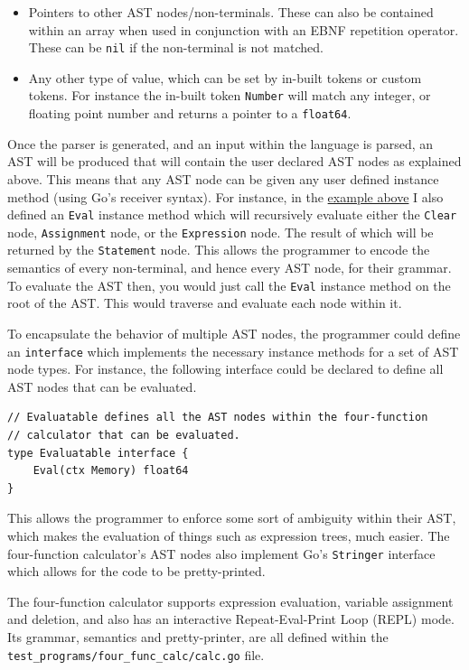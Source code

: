 \documentclass[]{full}
\theoremstyle{definition}
\begin{document}
\begin{itemize}
    \item Pointers to other AST nodes/non-terminals. These can also be contained within an array when used in conjunction with an EBNF repetition operator. These can be \verb|nil| if the non-terminal is not matched.
    \item Any other type of value, which can be set by in-built tokens or custom tokens. For instance the in-built token \verb|Number| will match any integer, or floating point number and returns a pointer to a \verb|float64|.
\end{itemize}

Once the parser is generated, and an input within the language is parsed, an AST will be produced that will contain the user declared AST nodes as explained above. This means that any AST node can be given any user defined instance method (using Go's receiver syntax). For instance, in the \hyperref[fig:four-func-calc-statement-ast-node]{example above} I also defined an \verb|Eval| instance method which will recursively evaluate either the \verb|Clear| node, \verb|Assignment| node, or the \verb|Expression| node. The result of which will be returned by the \verb|Statement| node. This allows the programmer to encode the semantics of every non-terminal, and hence every AST node, for their grammar. To evaluate the AST then, you would just call the \verb|Eval| instance method on the root of the AST. This would traverse and evaluate each node within it.

To encapsulate the behavior of multiple AST nodes, the programmer could define an \verb|interface| which implements the necessary instance methods for a set of AST node types. For instance, the following interface could be declared to define all AST nodes that can be evaluated.

\begin{verbatim}
// Evaluatable defines all the AST nodes within the four-function 
// calculator that can be evaluated.
type Evaluatable interface {
    Eval(ctx Memory) float64
}
\end{verbatim}

This allows the programmer to enforce some sort of ambiguity within their AST, which makes the evaluation of things such as expression trees, much easier. The four-function calculator's AST nodes also implement Go's \verb|Stringer| interface which allows for the code to be pretty-printed.

The four-function calculator supports expression evaluation, variable assignment and deletion, and also has an interactive Repeat-Eval-Print Loop (REPL) mode. Its grammar, semantics and pretty-printer, are all defined within the \verb|test_programs/four_func_calc/calc.go| file.
\end{document}
